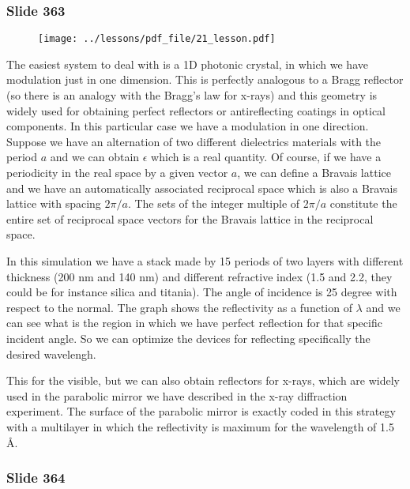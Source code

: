 \documentclass[../main/main.tex]{subfiles}
\begin{document}
\newpage

\subsubsection{Slide 363}

\begin{figure}[h!]
\centering
\texttt{[image: ../lessons/pdf\_file/21\_lesson.pdf]}
\end{figure}

The easiest system to deal with is a 1D photonic crystal, in which we have modulation just in one dimension.
This is perfectly analogous to a Bragg reflector (so there is an analogy with the Bragg’s law for x-rays) and this geometry is widely used for obtaining perfect reflectors or antireflecting coatings in optical components.
In this particular case we have a modulation in one direction. Suppose we have an alternation of two different dielectrics materials with the period $a$ and we can obtain $\epsilon$ which is a real quantity.
Of course, if we have a periodicity in the real space by a given vector $a$, we can define a Bravais lattice and we have an automatically associated reciprocal space which is also a Bravais lattice with spacing $2 \pi / a$.
The sets of the integer multiple of $2 \pi / a$ constitute the entire set of reciprocal space vectors for the Bravais lattice in the reciprocal space.

In this simulation we have a stack made by 15 periods of two layers with different thickness (200 nm and 140 nm) and different refractive index (1.5 and 2.2, they could be for instance silica and titania). The angle of incidence is 25 degree with respect to the normal.
The graph shows the reflectivity as a function of $\lambda$ and we can see what is the region in which we have perfect reflection for that specific incident angle.
So we can optimize the devices for reflecting specifically the desired wavelengh.

This for the visible, but we can also obtain reflectors for x-rays, which are widely used in the parabolic mirror we have described in the x-ray diffraction experiment. The surface of the parabolic mirror is exactly coded in this strategy with a multilayer in which the reflectivity is maximum for the wavelength of 1.5 $\si{\angstrom}$.


\newpage

\subsubsection{Slide 364}
\end{document}
